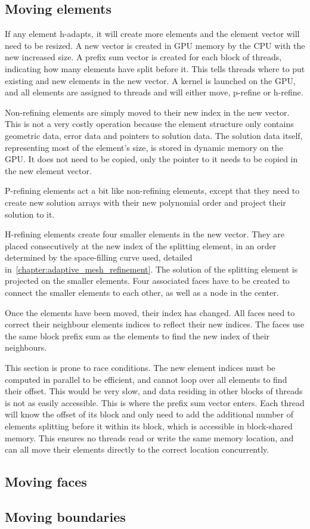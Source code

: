 \subsection{Moving elements} \label{subsection:adaptive_mesh_refinement:implementation:moving_elements}


If any element h-adapts, it will create more elements and the element vector will need to be
resized. A new vector is created in GPU memory by the CPU with the new increased size. A prefix sum
vector is created for each block of threads, indicating how many elements have split before it. This
tells threads where to put existing and new elements in the new vector. A kernel is launched on the
GPU, and all elements are assigned to threads and will either move, p-refine or h-refine.

Non-refining elements are simply moved to their new index in the new vector. This is not a very
costly operation because the element structure only contains geometric data, error data and pointers
to solution data. The solution data itself, representing most of the element's size, is stored in
dynamic memory on the GPU. It does not need to be copied, only the pointer to it needs to be copied
in the new element vector. 

P-refining elements act a bit like non-refining elements, except that they need to create new
solution arrays with their new polynomial order and project their solution to it.

H-refining elements create four smaller elements in the new vector. They are placed consecutively at
the new index of the splitting element, in an order determined by the space-filling curve used,
detailed in~\ref{chapter:adaptive_mesh_refinement}. The solution of the splitting element is
projected on the smaller elements. Four associated faces have to be created to connect the smaller
elements to each other, as well as a node in the center. 

Once the elements have been moved, their index has changed. All faces need to correct their
neighbour elements indices to reflect their new indices. The faces use the same block prefix sum as
the elements to find the new index of their neighbours.

This section is prone to race conditions. The new element indices must be computed in parallel to be
efficient, and cannot loop over all elements to find their offset. This would be very slow, and data
residing in other blocks of threads is not as easily accessible. This is where the prefix sum vector
enters. Each thread will know the offset of its block and only need to add the additional number of
elements splitting before it within its block, which is accessible in block-shared memory. This
ensures no threads read or write the same memory location, and can all move their elements directly
to the correct location concurrently.

\subsection{Moving faces} \label{subsection:adaptive_mesh_refinement:implementation:moving_faces}


\subsection{Moving boundaries} \label{subsection:adaptive_mesh_refinement:implementation:moving_boundaries}

